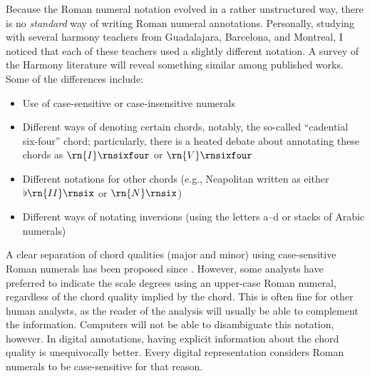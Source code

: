 Because the Roman numeral notation evolved in a rather
unstructured way, there is no \emph{standard} way of writing
Roman numeral annotations.
Personally, studying with several harmony teachers from
Guadalajara, Barcelona, and Montreal, I noticed that each of
these teachers used a slightly different notation. A survey
of the Harmony literature will reveal something similar
among published works. Some of the differences include:
\begin{itemize}
    \item Use of case-sensitive or case-insensitive numerals
    \item Different ways of denoting certain chords,
    notably, the so-called ``cadential six-four'' chord;
    particularly, there is a heated debate about annotating
    these chords as $\rn{I}\rnsixfour$ or $\rn{V}\rnsixfour$
    \item Different notations for other chords (e.g.,
    Neapolitan written as either $\flat\rn{II}\rnsix$ or
    $\rn{N}\rnsix$)
    \item Different ways of notating inversions (using the
    letters a--d or stacks of Arabic numerals)
\end{itemize}

A clear separation of chord qualities (major and minor)
using case-sensitive Roman numerals has been proposed since
\textcite{weber1817versuch}. However, some analysts have
preferred to indicate the scale degrees using an upper-case
Roman numeral, regardless of the chord quality implied by
the chord. This is often fine for other human analysts, as
the reader of the analysis will usually be able to
complement the information. Computers will not be able to
disambiguate this notation, however. In digital annotations,
having explicit information about the chord quality is
unequivocally better. Every digital representation considers
Roman numerals to be case-sensitive for that reason.


